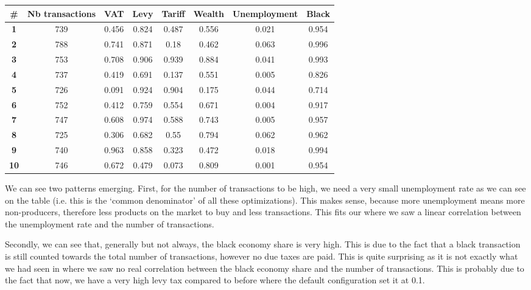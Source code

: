             \begin{table}[H]
            \centering
            \begin{tabular}{|c|c|c|c|c|c|c|c|}
                \hline
                \textbf{\#} & \textbf{Nb transactions}  & \textbf{VAT} & \textbf{Levy} & \textbf{Tariff} & \textbf{Wealth} & \textbf{Unemployment} & \textbf{Black} \\ \hline
                \textbf{1} & 739 & 0.456 & 0.824 & 0.487 & 0.556 & 0.021 & 0.954 \\ \hline
                \textbf{2} & 788 & 0.741 & 0.871 & 0.18 & 0.462 & 0.063 & 0.996 \\ \hline
                \textbf{3} & 753 & 0.708 & 0.906 & 0.939 & 0.884 & 0.041 & 0.993 \\ \hline
                \textbf{4} & 737 & 0.419 & 0.691 & 0.137 & 0.551 & 0.005 & 0.826 \\ \hline
                \textbf{5} & 726 & 0.091 & 0.924 & 0.904 & 0.175 & 0.044 & 0.714 \\ \hline
                \textbf{6} & 752 & 0.412 & 0.759 & 0.554 & 0.671 & 0.004 & 0.917 \\ \hline
                \textbf{7} & 747 & 0.608 & 0.974 & 0.588 & 0.743 & 0.005 & 0.957 \\ \hline
                \textbf{8} & 725 & 0.306 & 0.682 & 0.55 & 0.794 & 0.062 & 0.962 \\ \hline
                \textbf{9} & 740 & 0.963 & 0.858 & 0.323 & 0.472 & 0.018 & 0.994 \\ \hline
                \textbf{10} & 746 & 0.672 & 0.479 & 0.073 & 0.809 & 0.001 & 0.954 \\ \hline
            \end{tabular}
            \end{table}

            We can see two patterns emerging. First, for the number of transactions to be high, we need a very small unemployment rate as we can see on the table (i.e. this is the `common denominator' of all these optimizations). This makes sense, because more unemployment means more non-producers, therefore less products on the market to buy and less transactions. This fits our  where we saw a linear correlation between the unemployment rate and the number of transactions.

            Secondly, we can see that, generally but not always, the black economy share is very high. This is due to the fact that a black transaction is still counted towards the total number of transactions, however no due taxes are paid. This is quite surprising as it is not exactly what we had seen in  where we saw no real correlation between the black economy share and the number of transactions. This is probably due to the fact that now, we have a very high levy tax compared to before where the default configuration set it at 0.1.

